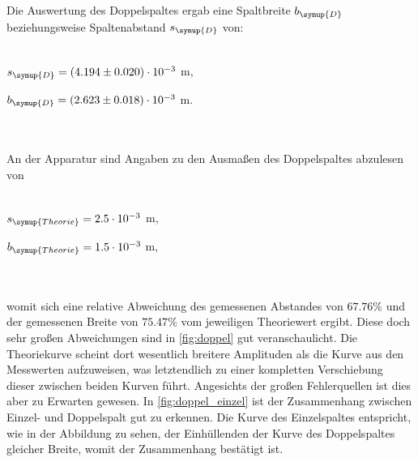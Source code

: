 Die Auswertung des Doppelspaltes ergab eine Spaltbreite $b_{\symup{D}}$ beziehungsweise Spaltenabstand $s_{\symup{D}}$ von:
\\ \\
    \centerline{$s_{\symup{D}} = (4.194 \pm 0.020) \cdot 10^{-3} $ m,}
    \centerline{$b_{\symup{D}} = (2.623 \pm 0.018) \cdot 10^{-3}$ m.}
\\ \\
An der Apparatur sind Angaben zu den Ausmaßen des Doppelspaltes abzulesen von
 \\ \\
    \centerline{$s_{\symup{Theorie}} = 2.5 \cdot 10^{-3} $ m,}
    \centerline{$b_{\symup{Theorie}} = 1.5 \cdot 10^{-3}$ m,}
 \\ \\
womit sich eine relative Abweichung des gemessenen Abstandes von $67.76 \%$ und der gemessenen Breite von $75.47\%$ vom jeweiligen Theoriewert
ergibt. Diese doch sehr großen Abweichungen sind in \autoref{fig:doppel} gut veranschaulicht. Die Theoriekurve scheint dort wesentlich breitere
Amplituden als die Kurve aus den Messwerten aufzuweisen, was letztendlich zu einer kompletten Verschiebung dieser zwischen beiden Kurven führt.
Angesichts der großen Fehlerquellen ist dies aber zu Erwarten gewesen. In \autoref{fig:doppel_einzel} ist der Zusammenhang zwischen Einzel- und 
Doppelspalt gut zu erkennen. Die Kurve des Einzelspaltes entspricht, wie in der Abbildung zu sehen, der Einhüllenden der Kurve des Doppelspaltes 
gleicher Breite, womit der Zusammenhang bestätigt ist.